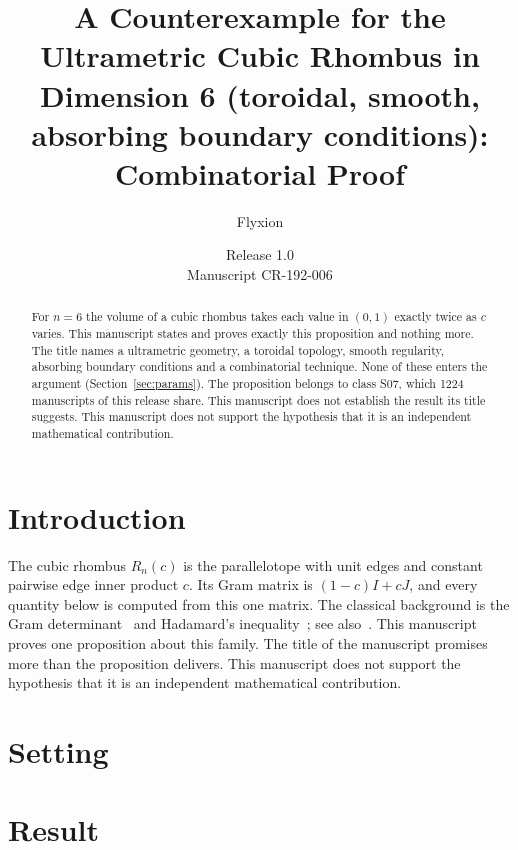 \documentclass[11pt]{article}
\title{A Counterexample for the Ultrametric Cubic Rhombus in Dimension 6 (toroidal, smooth, absorbing boundary conditions): Combinatorial Proof}
\author{Flyxion}
\date{Release 1.0\\ Manuscript CR-192-006}
\begin{document}
\maketitle
\begin{abstract}
For $n=6$ the volume of a cubic rhombus takes each value in $(0,1)$ exactly twice as $c$ varies. This manuscript states and proves exactly this proposition and nothing more. The title names a ultrametric geometry, a toroidal topology, smooth regularity, absorbing boundary conditions and a combinatorial technique. None of these enters the argument (Section~\ref{sec:params}). The proposition belongs to class S07, which 1224 manuscripts of this release share. This manuscript does not establish the result its title suggests. This manuscript does not support the hypothesis that it is an independent mathematical contribution.
\end{abstract}

\section{Introduction}
The cubic rhombus $R_n(c)$ is the parallelotope with unit edges and constant pairwise edge inner product $c$. Its Gram matrix is $(1-c)I+cJ$, and every quantity below is computed from this one matrix. The classical background is the Gram determinant~\cite{gram} and Hadamard's inequality~\cite{hadamard}; see also~\cite{hj}.
This manuscript proves one proposition about this family. The title of the manuscript promises more than the proposition delivers. This manuscript does not support the hypothesis that it is an independent mathematical contribution.

\section{Setting}


\section{Result}

\end{document}
